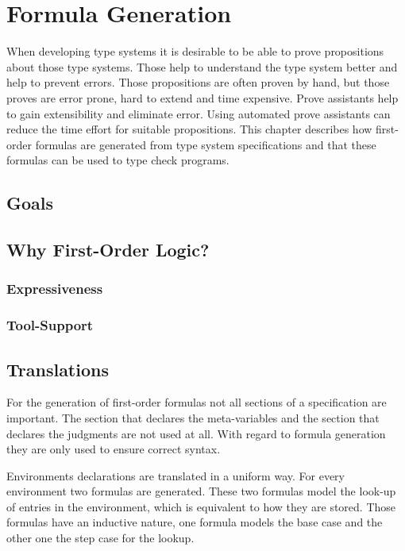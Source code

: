 \chapter{Formula Generation}
\label{ch:formula-generation}
When developing type systems it is desirable to be able to prove
propositions about those type systems. Those help to understand the
type system better and help to prevent errors. Those propositions are
often proven by hand, but those proves are error prone, hard to extend
and time expensive. Prove assistants help to gain extensibility and
eliminate error. Using automated prove assistants can reduce the time
effort for suitable propositions. This chapter describes how
first-order formulas are generated from type system specifications and
that these formulas can be used to type check programs.
 
\section{Goals}
\section{Why First-Order Logic?}
\subsection{Expressiveness}
\subsection{Tool-Support}
\section{Translations}
\label{sec:translations}
For the generation of first-order formulas not all sections of a
specification are important. The section that declares the
meta-variables and the section that declares the judgments are not
used at all. With regard to formula generation they are only used to
ensure correct syntax.


Environments declarations are translated in a uniform way. For every
environment two formulas are generated. These two formulas model the
look-up of entries in the environment, which is equivalent to how they
are stored. Those formulas have an inductive nature, one formula
models the base case and the other one the step case for the lookup.

